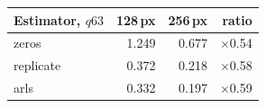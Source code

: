 \begin{tabular}{lrrr}
\toprule
Estimator, $q63$ & 128\,px & 256\,px & ratio \\
\midrule
zeros & 1.249 & 0.677 & $\times$0.54 \\
replicate & 0.372 & 0.218 & $\times$0.58 \\
arls & 0.332 & 0.197 & $\times$0.59 \\
\bottomrule
\end{tabular}
